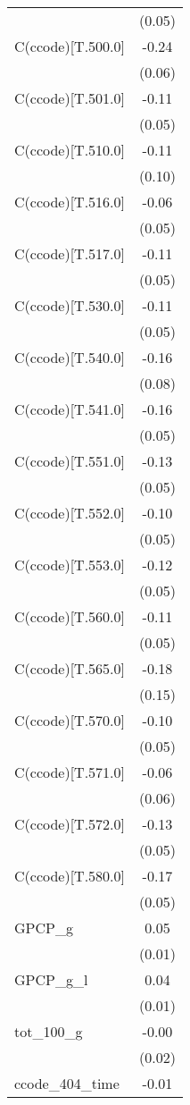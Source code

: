{\begin{tabular}{@{\extracolsep{2pt}}l*{1}{c}@{}}
 & (0.05) \\
C(ccode)[T.500.0] & -0.24\sym{**} \\
 & (0.06) \\
C(ccode)[T.501.0] & -0.11\sym{*} \\
 & (0.05) \\
C(ccode)[T.510.0] & -0.11 \\
 & (0.10) \\
C(ccode)[T.516.0] & -0.06 \\
 & (0.05) \\
C(ccode)[T.517.0] & -0.11\sym{*} \\
 & (0.05) \\
C(ccode)[T.530.0] & -0.11\sym{*} \\
 & (0.05) \\
C(ccode)[T.540.0] & -0.16\sym{*} \\
 & (0.08) \\
C(ccode)[T.541.0] & -0.16\sym{**} \\
 & (0.05) \\
C(ccode)[T.551.0] & -0.13\sym{**} \\
 & (0.05) \\
C(ccode)[T.552.0] & -0.10\sym{+} \\
 & (0.05) \\
C(ccode)[T.553.0] & -0.12\sym{*} \\
 & (0.05) \\
C(ccode)[T.560.0] & -0.11\sym{*} \\
 & (0.05) \\
C(ccode)[T.565.0] & -0.18 \\
 & (0.15) \\
C(ccode)[T.570.0] & -0.10\sym{*} \\
 & (0.05) \\
C(ccode)[T.571.0] & -0.06 \\
 & (0.06) \\
C(ccode)[T.572.0] & -0.13\sym{**} \\
 & (0.05) \\
C(ccode)[T.580.0] & -0.17\sym{**} \\
 & (0.05) \\
GPCP\_g & 0.05\sym{**} \\
 & (0.01) \\
GPCP\_g\_l & 0.04\sym{**} \\
 & (0.01) \\
tot\_100\_g & -0.00 \\
 & (0.02) \\
ccode\_404\_time & -0.01\sym{**} \\

\end{tabular}}
